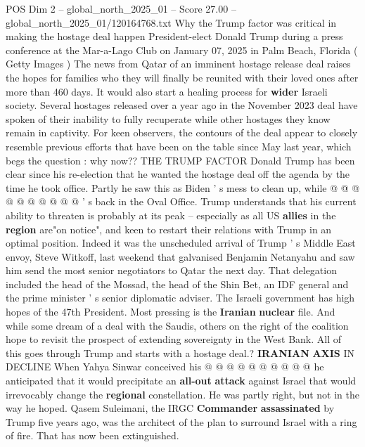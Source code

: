 \begin{textsample}{POS Dim 2 – global\_north\_2025\_01 – Score 27.00 – global\_north\_2025\_01/120164768.txt}  \label{ex:f2_pos_391}
Why the Trump factor was critical in making the hostage deal happen President-elect Donald Trump during a press conference at the Mar-a-Lago Club on January 07, 2025 in Palm Beach, Florida ( Getty Images ) The news from Qatar of an imminent hostage release deal raises the hopes for families who they will finally be reunited with their loved ones after more than 460 days.
It would also start a healing process for \textbf{wider} Israeli society.
Several hostages released over a year ago in the November 2023 deal have spoken of their inability to fully recuperate while other hostages they know remain in captivity.
For keen observers, the contours of the deal appear to closely resemble previous efforts that have been on the table since May last year, which begs the question : why now??
THE TRUMP FACTOR Donald Trump has been clear since his re-election that he wanted the hostage deal off the agenda by the time he took office.
Partly he saw this as Biden ' s mess to clean up, while @ @ @ @ @ @ @ @ @ @ ' s back in the Oval Office.
Trump understands that his current ability to threaten is probably at its peak -- especially as all US \textbf{allies} in the \textbf{region} are"on notice", and keen to restart their relations with Trump in an optimal position.
Indeed it was the unscheduled arrival of Trump ' s Middle East envoy, Steve Witkoff, last weekend that galvanised Benjamin Netanyahu and saw him send the most senior negotiators to Qatar the next day.
That delegation included the head of the Mossad, the head of the Shin Bet, an IDF general and the prime minister ' s senior diplomatic adviser.
The Israeli government has high hopes of the 47th President.
Most pressing is the \textbf{Iranian} \textbf{nuclear} file.
And while some dream of a deal with the Saudis, others on the right of the coalition hope to revisit the prospect of extending sovereignty in the West Bank.
All of this goes through Trump and starts with a hostage deal.? \textbf{IRANIAN} \textbf{AXIS} IN DECLINE When Yahya Sinwar conceived his @ @ @ @ @ @ @ @ @ @ he anticipated that it would precipitate an \textbf{all-out} \textbf{attack} against Israel that would irrevocably change the \textbf{regional} constellation.
He was partly right, but not in the way he hoped.
Qasem Suleimani, the IRGC \textbf{Commander} \textbf{assassinated} by Trump five years ago, was the architect of the plan to surround Israel with a ring of fire.
That has now been extinguished.

\end{textsample}
